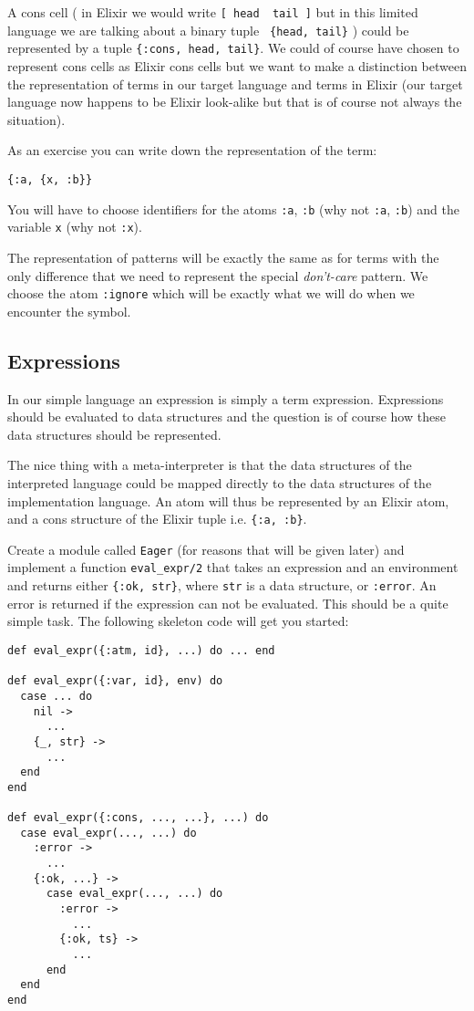 \documentclass[a4paper,11pt]{article}
\begin{document}
A cons cell ( in Elixir we would write {\tt [ head \textbar\ tail ]}
but in this limited language we are talking about a binary tuple {\tt
  \{head, tail\}} ) could be represented by a tuple {\tt \{:cons,
  head, tail\}}. We could of course have chosen to represent cons
cells as Elixir cons cells but we want to make a distinction between
the representation of terms in our target language and terms in Elixir
(our target language now happens to be Elixir look-alike but that is
of course not always the situation).

As an exercise you can write down the representation of the term:

\begin{verbatim}
{:a, {x, :b}}
\end{verbatim}

You will have to choose identifiers for the atoms {\tt :a}, {\tt :b}
(why not {\tt :a}, {\tt :b}) and the variable {\tt x} (why
not {\tt :x}).

The representation of patterns will be exactly the same as for terms
with the only difference that we need to represent the special {\em
  don't-care} pattern. We choose the atom {\tt :ignore} which will be
exactly what we will do when we encounter the symbol.

\subsection{Expressions}
In our simple language an expression is simply a term
expression. Expressions should be evaluated to data structures and the
question is of course how these data structures should be represented.

The nice thing with a meta-interpreter is that the data structures of
the interpreted language could be mapped directly to the data
structures of the implementation language. An atom will thus be
represented by an Elixir atom, and a cons structure of the Elixir tuple
 i.e. {\tt \{:a, :b\}}. 

Create a module called {\tt Eager} (for reasons that will be given
later) and implement a function {\tt eval\_expr/2} that takes an
expression and an environment and returns either {\tt \{:ok, str\}},
where {\tt str} is a data structure, or {\tt :error}. An error is
returned if the expression can not be evaluated. This should be a
quite simple task. The following skeleton code will get you started:

\begin{verbatim}
def eval_expr({:atm, id}, ...) do ... end

def eval_expr({:var, id}, env) do
  case ... do
    nil ->
      ...
    {_, str} ->
      ...
  end
end

def eval_expr({:cons, ..., ...}, ...) do
  case eval_expr(..., ...) do
    :error ->
      ...
    {:ok, ...} ->
      case eval_expr(..., ...) do
        :error ->
          ...
        {:ok, ts} ->
          ...
      end
  end
end
\end{verbatim}
\end{document}
